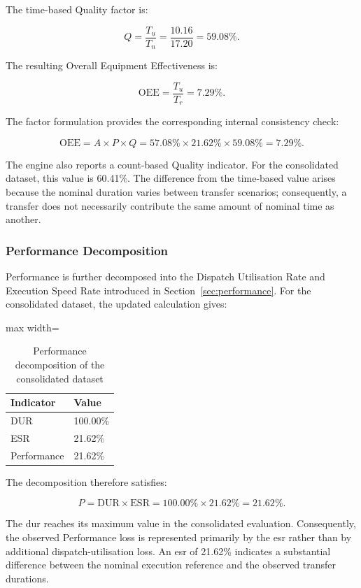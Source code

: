 The time-based Quality factor is:

$$
Q = \frac{T_u}{T_n} = \frac{10.16}{17.20} = 59.08\%.
$$

The resulting Overall Equipment Effectiveness is:

$$
\mathrm{OEE} = \frac{T_u}{T_r} = 7.29\%.
$$

The factor formulation provides the corresponding internal consistency check:

$$
\mathrm{OEE} = A \times P \times Q = 57.08\% \times 21.62\% \times 59.08\% = 7.29\%.
$$

The engine also reports a count-based Quality indicator. For the consolidated dataset, this value is 60.41\%. The difference from the time-based value arises because the nominal duration varies between transfer scenarios; consequently, a transfer does not necessarily contribute the same amount of nominal time as another.
\subsubsection*{Performance Decomposition}
Performance is further decomposed into the Dispatch Utilisation Rate and Execution Speed Rate introduced in Section~\ref{sec:performance}. For the consolidated dataset, the updated calculation gives:

\begin{table}[htbp]
\small
\renewcommand{\arraystretch}{1.3}
\centering
\caption{Performance decomposition of the consolidated dataset}
\label{tab:performance-decomposition-consolidated-dataset}
\begin{adjustbox}{max width=\textwidth}
\begin{tabular}{|p{5.0cm}|p{3.0cm}|}
\hline
\textbf{Indicator} & \textbf{Value} \\
\hline
DUR & 100.00\% \\
\hline
ESR & 21.62\% \\
\hline
Performance & 21.62\% \\
\hline
\end{tabular}
\end{adjustbox}
\end{table}

The decomposition therefore satisfies:

$$
P = \mathrm{DUR} \times \mathrm{ESR} = 100.00\% \times 21.62\% = 21.62\%.
$$

The \acrshort{dur} reaches its maximum value in the consolidated evaluation. Consequently, the observed Performance loss is represented primarily by the \acrshort{esr} rather than by additional dispatch-utilisation loss. An \acrshort{esr} of 21.62\% indicates a substantial difference between the nominal execution reference and the observed transfer durations.

